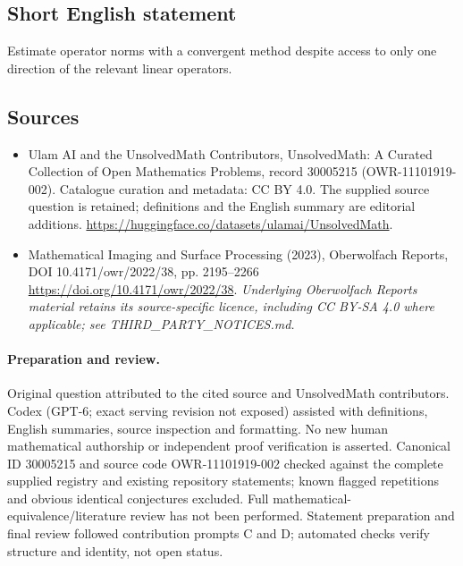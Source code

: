 \documentclass[11pt]{article}
\begin{document}
\subsection{Short English statement}
Estimate operator norms with a convergent method despite access to only one direction of the relevant linear operators.
\subsection{Sources}
\begin{itemize}
\item[\hypertarget{source:30005215:1}{S1}] Ulam AI and the UnsolvedMath Contributors, UnsolvedMath: A Curated Collection of Open Mathematics Problems, record 30005215 (OWR-11101919-002). Catalogue curation and metadata: CC BY 4.0. The supplied source question is retained; definitions and the English summary are editorial additions.
\url{https://huggingface.co/datasets/ulamai/UnsolvedMath}.
\item[\hypertarget{source:30005215:2}{S2}] Mathematical Imaging and Surface Processing (2023), Oberwolfach Reports, DOI 10.4171/owr/2022/38, pp. 2195--2266
\url{https://doi.org/10.4171/owr/2022/38}.
\textit{Underlying Oberwolfach Reports material retains its source-specific licence, including CC BY-SA 4.0 where applicable; see THIRD\_PARTY\_NOTICES.md.}
\end{itemize}
\paragraph{Preparation and review.}
Original question attributed to the cited source and UnsolvedMath contributors. Codex (GPT-6; exact serving revision not exposed) assisted with definitions, English summaries, source inspection and formatting. No new human mathematical authorship or independent proof verification is asserted. Canonical ID 30005215 and source code OWR-11101919-002 checked against the complete supplied registry and existing repository statements; known flagged repetitions and obvious identical conjectures excluded. Full mathematical-equivalence/literature review has not been performed. Statement preparation and final review followed contribution prompts C and D; automated checks verify structure and identity, not open status.
\label{end:30005215}
\end{document}
